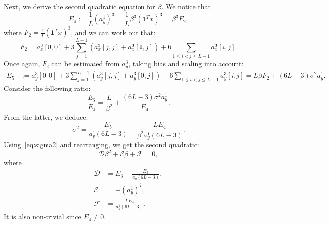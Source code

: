 \documentclass[12pt]{article}
\newcommand{\1}{\mathbf{1}}
\newcommand{\one}{\mathbf{1}}
\theoremstyle{plain}
\theoremstyle{definition}
\theoremstyle{remark}
\theoremstyle{plain}
\theoremstyle{remark}
\theoremstyle{plain}
\theoremstyle{plain}
\begin{document}
Next, we derive the second quadratic equation for $\beta$. We notice that 
\begin{equation} \label{eq:E3}
E_4 := \frac{1}{L}(a_y^1)^3 = \frac{1}{L}\beta^3 (\one ^Tx)^3   = \beta^3 F_2,
\end{equation}
where $F_2 = \frac{1}{L}(\one ^Tx)^3$, and we can work out that:
\begin{equation*}
F_2 = a_x^3[0,0] + 3\sum_{j=1}^{L-1} \left(a_x^3[j,j] + a_x^3[0,j]\right) + 6\sum_{1\leq i < j\leq L-1}a_x^3[i,j].
\end{equation*}
Once again, $F_2$ can be estimated from $a_y^3$, taking bias and scaling into account:
\begin{align}
E_5 & := a_y^3[0,0] + 3\sum_{j=1}^{L-1} \left(a_y^3[j,j] + a_y^3[0,j]\right) + 6\sum_{1\leq i < j\leq L-1}a_y^3[i,j]  = L \beta F_2 + (6L-3)\sigma^2a_y^1.
\end{align}
Consider the following ratio:
\begin{equation*} 
\frac{E_5}{E_4} = \frac{L}{\beta^2} + \frac{(6L-3)\sigma^2a_y^1}{E_4}.
\end{equation*}
From the latter, we deduce:
\begin{equation*}
\sigma^2 = \frac{E_5}{a_y^1(6L-3)}  - \frac{LE_4}{\beta^2a_y^1(6L-3)}.
\end{equation*}
Using~\eqref{eq:sigma2} and rearranging, we get the second quadratic:
\begin{equation} \label{eq:quad2}
\mathcal{D}\beta^2 + \mathcal{E}\beta + \mathcal{F} = 0,
\end{equation}
where
\begin{align*}
\mathcal{D} &= E_3 - \frac{E_5}{a_y^1(6L-3)}, \\ 
\mathcal{E} &= -(a_y^1)^2, \\
\mathcal{F} &= \frac{LE_4}{a_y^1(6L-3)}.
\end{align*}
It is also non-trivial since $E_4 \neq 0$.
\end{document}
